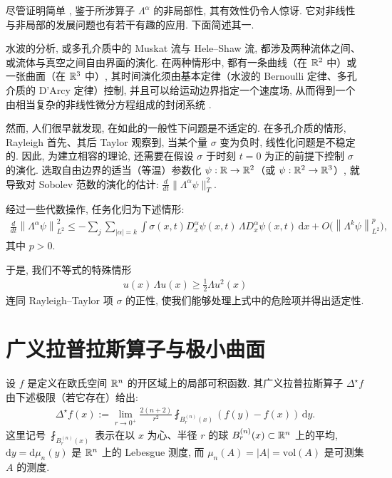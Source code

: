 尽管证明简单 \cite{b27,b30}, 鉴于所涉算子 $\Lambda^{\alpha}$ 的非局部性, 其有效性仍令人惊讶. 它对非线性与非局部的发展问题也有若干有趣的应用. 下面简述其一.

水波的分析, 或多孔介质中的 Muskat 流与 Hele--Shaw 流, 都涉及两种流体之间、或流体与真空之间自由界面的演化. 在两种情形中, 都有一条曲线（在 $\mathbb{R}^2$ 中）或一张曲面（在 $\mathbb{R}^3$ 中）, 其时间演化须由基本定律（水波的 Bernoulli 定律、多孔介质的 D'Arcy 定律）控制, 并且可以给运动边界指定一个速度场, 从而得到一个由相当复杂的非线性微分方程组成的封闭系统 \cite{b28}.

然而, 人们很早就发现, 在如此的一般性下问题是不适定的. 在多孔介质的情形, Rayleigh 首先、其后 Taylor 观察到, 当某个量 $\sigma$ 变为负时, 线性化问题是不稳定的. 因此, 为建立相容的理论, 还需要在假设 $\sigma$ 于时刻 $t = 0$ 为正的前提下控制 $\sigma$ 的演化. 选取自由边界的适当（等温）参数化 $\psi: \mathbb{R} \to \mathbb{R}^2$（或 $\psi: \mathbb{R}^2 \to \mathbb{R}^3$）, 就导致对 Sobolev 范数的演化的估计: $\frac{d}{dt} \|\Lambda^\alpha \psi\|_T^2$.

经过一些代数操作, 任务化归为下述情形:
\begin{align*}
  \frac{d}{d t}\left\|\Lambda^{\alpha}\psi\right\|_{L^{2}}^{2}
  \leq-\sum_{j}\sum_{|\alpha|=k}\int\sigma(x,t)D_{x}^{\alpha}\psi(x,t)\,\Lambda D_{x}^{\alpha}\psi(x,t)\,\mathrm{d}x
  +O\big(\left\|\Lambda^{k}\psi\right\|_{L^{2}}^{p}\big),
\end{align*}
其中 $p > 0$.

于是, 我们不等式的特殊情形
\begin{align*}
  u(x)\,\Lambda u(x)\geq\frac{1}{2}\Lambda u^{2}(x)
\end{align*}
连同 Rayleigh--Taylor 项 $\sigma$ 的正性, 使我们能够处理上式中的危险项并得出适定性.

\section{广义拉普拉斯算子与极小曲面}

设 $f$ 是定义在欧氏空间 $\mathbb{R}^n$ 的开区域上的局部可积函数. 其广义拉普拉斯算子 $\Delta^\star f$ 由下述极限（若它存在）给出:
\begin{align*}
  \Delta^{\star}f(x):=\lim_{r\rightarrow0^{+}}\frac{2(n+2)}{r^{2}}\fint_{B_{r}^{(n)}(x)}(f(y)-f(x))\,\mathrm{d}y.
\end{align*}
这里记号 $\fint_{B_r^{(n)}(x)}$ 表示在以 $x$ 为心、半径 $r$ 的球 $B_r^{(n)}(x) \subset \mathbb{R}^n$ 上的平均, $\mathrm{d}y = \mathrm{d}\mu_n(y)$ 是 $\mathbb{R}^n$ 上的 Lebesgue 测度, 而 $\mu_n(A) = |A| = \mathrm{vol}(A)$ 是可测集 $A$ 的测度.

